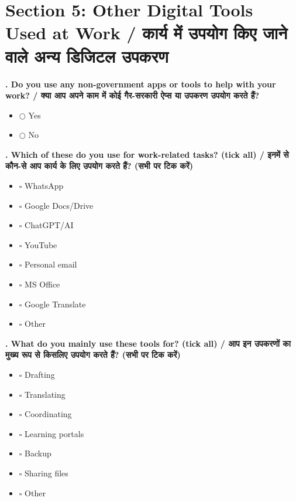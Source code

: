 \documentclass[11pt,a4paper]{article}
\newcounter{qcounter}
\begin{document}
\section*{Section 5: Other Digital Tools Used at Work / कार्य में उपयोग किए जाने वाले अन्य डिजिटल उपकरण}
\vspace{0.2cm}
\textbf{. Do you use any non-government apps or tools to help with your work? / क्या आप अपने काम में कोई गैर-सरकारी ऐप्स या उपकरण उपयोग करते हैं?}
\vspace{0.1cm}
\begin{itemize}[label=, itemsep=0.1cm, leftmargin=0.5cm]
    \item $\bigcirc$ Yes
    \item $\bigcirc$ No
\end{itemize}
\vspace{0.2cm}

\textbf{. Which of these do you use for work-related tasks? (tick all) / इनमें से कौन-से आप कार्य के लिए उपयोग करते हैं? (सभी पर टिक करें)}
\vspace{0.1cm}
\begin{itemize}[label=, itemsep=0.1cm, leftmargin=0.5cm]
    \item $\square$ WhatsApp
    \item $\square$ Google Docs/Drive
    \item $\square$ ChatGPT/AI
    \item $\square$ YouTube
    \item $\square$ Personal email
    \item $\square$ MS Office
    \item $\square$ Google Translate
    \item $\square$ Other
\end{itemize}
\vspace{0.2cm}

\textbf{. What do you mainly use these tools for? (tick all) / आप इन उपकरणों का मुख्य रूप से किसलिए उपयोग करते हैं? (सभी पर टिक करें)}
\vspace{0.1cm}
\begin{itemize}[label=, itemsep=0.1cm, leftmargin=0.5cm]
    \item $\square$ Drafting
    \item $\square$ Translating
    \item $\square$ Coordinating
    \item $\square$ Learning portals
    \item $\square$ Backup
    \item $\square$ Sharing files
    \item $\square$ Other
\end{itemize}
\vspace{0.2cm}
\end{document}
